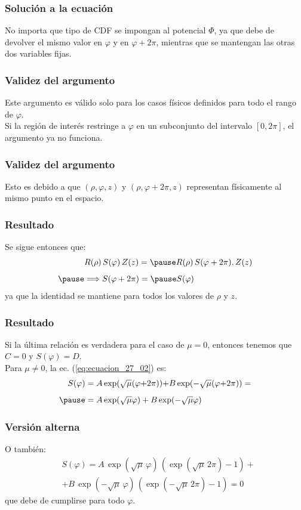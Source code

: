 \documentclass[12pt]{beamer}
\begin{document}
\begin{frame}
\frametitle{Solución a la ecuación}
No importa que tipo de CDF se impongan al potencial $\Phi$, \pause ya que debe de devolver el mismo valor en $\varphi$ y en $\varphi + 2 \pi$, mientras que se mantengan las otras dos variables fijas.
\end{frame}
\begin{frame}
\frametitle{Validez del argumento}
Este argumento es válido solo para los casos físicos definidos para todo el rango de $\varphi$. 
\\
\bigskip
\pause
Si la región de interés restringe a $\varphi$ en un subconjunto del intervalo $[0, 2 \pi]$, el argumento ya no funciona.
\end{frame}
\begin{frame}
\frametitle{Validez del argumento}
Esto es debido a que $(\rho, \varphi, z)$ y $(\rho, \varphi + 2 \pi, z)$ representan físicamente al mismo punto en el espacio.
\end{frame}
\begin{frame}
\frametitle{Resultado}
Se sigue entonces que:
\pause
\begin{eqnarray*}
&R(\rho) \, S(\varphi) \, Z(z) = \pause R(\rho)  \, S(\varphi + 2 \pi) , Z(z) \\[0.5em] \pause
&\Longrightarrow S(\varphi + 2 \pi) = \pause S (\varphi)
\end{eqnarray*}
ya que la identidad se mantiene para todos los valores de $\rho$ y $z$.
\end{frame}
\begin{frame}
\frametitle{Resultado}
Si la última relación es verdadera para el caso de $\mu = 0$, \pause entonces tenemos que $C = 0$ y $S(\varphi) = D$.
\\
\bigskip
\pause
Para $\mu \neq 0$, la ec. (\ref{eq:ecuacion_27_02}) es:
\pause
\begin{align*}
S (\varphi) &= A \exp(\sqrt{\mu}(\varphi {+} 2 \pi)) {+} B \exp(- \sqrt{\mu}(\varphi {+} 2 \pi)) = \\[0.5em] \pause
&= A \exp(\sqrt{\mu} \varphi) + B \exp(-\sqrt{\mu} \varphi)
\end{align*}
\end{frame}
\begin{frame}
\frametitle{Versión alterna}
O también:
\pause
\begin{align*}
&S (\varphi) = A \, \exp(\sqrt{\mu} \, \varphi) \, (\exp(\sqrt{\mu} \, 2 \pi) - 1) + \\[0.5em]
&+ B \, \exp(- \sqrt{\mu} \, \varphi) \, (\exp(- \sqrt{\mu} \, 2 \pi) - 1) = 0
\end{align*}
\pause
que debe de cumplirse para todo $\varphi$.
\end{frame}
\end{document}
